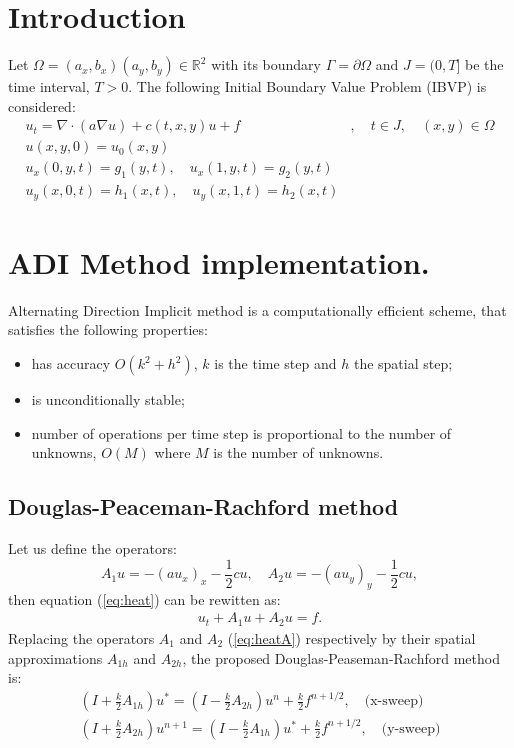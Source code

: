\documentclass[12pt]{article}
\begin{document}
\section{Introduction}
Let $\Omega=(a_x, b_x)(a_y, b_y)\in \mathbb{R}^2$ with its boundary $\Gamma=\partial \Omega$ and
$J=(0,T]$ be the time interval, $T>0$. The following Initial Boundary Value Problem (IBVP) is considered:
\begin{eqnarray}
u_t= \nabla\cdot(a\nabla u) + c(t, x, y) u + f&, \quad t\in J, \quad (x,y)\in \Omega \label{eq:heat}\\
u(x,y,0) = u_0(x,y)&\\
u_x(0,y,t)= g_1(y,t), \quad u_x(1,y,t)=g_2(y,t)&\\
u_y(x,0,t)= h_1(x,t), \quad u_y(x,1,t)= h_2(x,t)& 
\end{eqnarray}




\section{ADI Method implementation.}
 Alternating Direction Implicit method is a computationally efficient scheme,
 that satisfies the following properties:
  \begin{itemize}
    \item has accuracy $O(k^2 + h^2)$, $k$ is the time step and $h$ the spatial
    step;
    \item is unconditionally stable;
    \item number of operations per time step is proportional to the number of unknowns, $O(M)$
     where $ M$ is the number of unknowns.       
  \end{itemize}

\subsection{Douglas-Peaceman-Rachford method}
Let us define the operators:
$$A_1u = -(au_x)_x - \frac{1}{2}cu, \quad A_2u = -(au_y)_y - \frac{1}{2}cu,$$
then equation (\ref{eq:heat}) can be rewitten as:
\begin{eqnarray} 
u_t + A_1u + A_2u = f. \label{eq:heatA}
\end{eqnarray}
Replacing the operators $A_1$ and $A_2$ (\ref{eq:heatA}) respectively by their spatial approximations
$A_{1h}$ and $A_{2h}$, the proposed Douglas-Peaseman-Rachford method is:
\begin{eqnarray}
(I+\frac{k}{2}A_{1h})u^* = (I-\frac{k}{2}A_{2h})u^n + \frac{k}{2}f^{n+1/2}, \quad \text{(x-sweep)} 
\label{equ:x-sweep}\\
(I+\frac{k}{2}A_{2h})u^{n+1} = (I-\frac{k}{2}A_{1h})u^* + \frac{k}{2}f^{n+1/2}, \quad \text{(y-sweep)}
\end{eqnarray} \label{equ:y-sweep}
\end{document}

